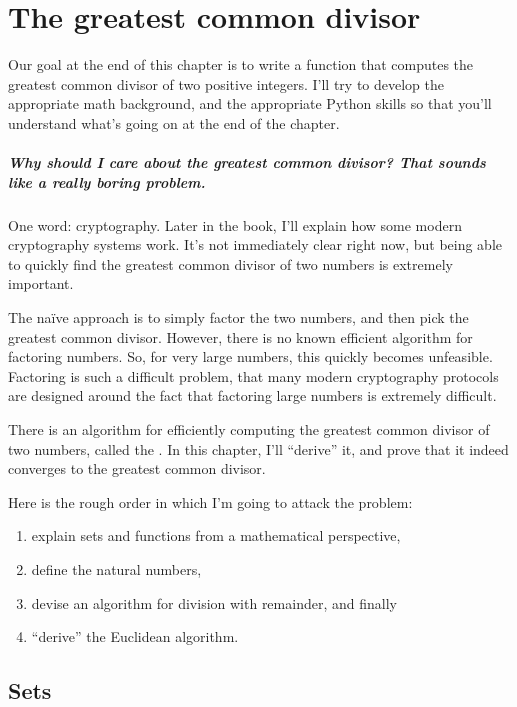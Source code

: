 \chapter{The greatest common divisor}

Our goal at the end of this chapter is to write a function that
computes the greatest common divisor of two positive integers. I'll
try to develop the appropriate math background, and the appropriate
Python skills so that you'll understand what's going on at the end of
the chapter.

\paragraph{Why should I care about the greatest common divisor? That
  sounds like a really boring problem.}

One word: cryptography. Later in the book, I'll explain how some
modern cryptography systems work. It's not immediately clear right
now, but being able to quickly find the greatest common divisor of two
numbers is extremely important.

The na\"ive approach is to simply factor the two numbers, and then
pick the greatest common divisor. However, there is no known efficient
algorithm for factoring numbers. So, for very large numbers, this
quickly becomes unfeasible. Factoring is such a difficult problem,
that many modern cryptography protocols are designed around the fact
that factoring large numbers is extremely difficult.

There is an algorithm for efficiently computing the greatest common
divisor of two numbers, called the . In this
chapter, I'll ``derive'' it, and prove that it indeed converges to the
greatest common divisor.

Here is the rough order in which I'm going to attack the problem:

\begin{enumerate}
\item explain sets and functions from a mathematical perspective,
\item define the natural numbers,
\item devise an algorithm for division with remainder, and finally
\item ``derive'' the Euclidean algorithm.
\end{enumerate}

\section{Sets}


